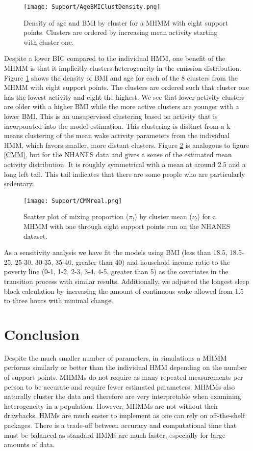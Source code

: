 \documentclass[num-refs]{wiley-article}
\begin{document}
\begin{figure}
    \texttt{[image: Support/AgeBMIClustDensity.png]}
    \centering
    \caption{Density of age and BMI by cluster for a MHMM with eight support points. Clusters are ordered by increasing mean activity starting with cluster one.}
    \label{AgeBMIdens}
\end{figure}


Despite a lower BIC compared to the individual HMM, one benefit of the MHMM is that it implicitly clusters heterogeneity in the emission distribution. Figure \ref{AgeBMIdens} shows the density of BMI and age for each of the 8 clusters from the MHMM with eight support points. The clusters are ordered such that cluster one has the lowest activity and eight the highest. We see that lower activity clusters are older with a higher BMI while the more active clusters are younger with a lower BMI. This is an unsupervised clustering based on activity that is incorporated into the model estimation. This clustering is distinct from a k-means clustering of the mean wake activity parameters from the individual HMM, which favors smaller, more distant clusters. Figure \ref{CMMreal} is analogous to figure \ref{CMM}, but for the NHANES data and gives a sense of the estimated mean activity distribution. It is roughly symmetrical with a mean at around 2.5 and a long left tail. This tail indicates that there are some people who are particularly sedentary. 

\begin{figure}
    \texttt{[image: Support/CMMreal.png]}
    \centering
    \caption{Scatter plot of mixing proportion ($\pi_l$) by cluster mean ($\nu_l$) for a MHMM with one through eight support points run on the NHANES dataset.}
    \label{CMMreal}
\end{figure}

As a sensitivity analysis we have fit the models using BMI (less than 18.5, 18.5-25, 25-30, 30-35, 35-40, greater than 40) and household income ratio to the poverty line (0-1, 1-2, 2-3, 3-4, 4-5, greater than 5) as the covariates in the transition process with similar results. Additionally, we adjusted the longest sleep block calculation by increasing the amount of continuous wake allowed from 1.5 to three hours with minimal change. 


\section{Conclusion}


Despite the much smaller number of parameters, in simulations a MHMM performs similarly or better than the individual HMM depending on the number of support points. MHMMs do not require as many repeated measurements per person to be accurate and require fewer estimated parameters. MHMMs also naturally cluster the data and therefore are very interpretable when examining heterogeneity in a population. However, MHMMs are not without their drawbacks. HMMs are much easier to implement as one can rely on off-the-shelf packages. There is a trade-off between accuracy and computational time that must be balanced as standard HMMs are much faster, especially for large amounts of data. 
\end{document}
